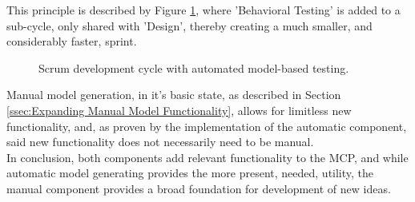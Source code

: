 This principle is described by Figure \ref{fig:scrumSmall}, where 'Behavioral Testing' is added to a sub-cycle, only shared with 'Design', thereby creating a much smaller, and considerably faster, sprint.
\newpage
\begin{figure}[h]
  \centering
  \caption{Scrum development cycle with automated model-based testing.}
  \label{fig:scrumSmall}
\end{figure}

Manual model generation, in it's basic state, as described in Section \ref{ssec:Expanding Manual Model Functionality}, allows for limitless new functionality, and, as proven by the implementation of the automatic component, said new functionality does not necessarily need to be manual.\\[0.5cm]
In conclusion, both components add relevant functionality to the MCP, and while automatic model generating provides the more present, needed, utility, the manual component provides a broad foundation for development of new ideas.

